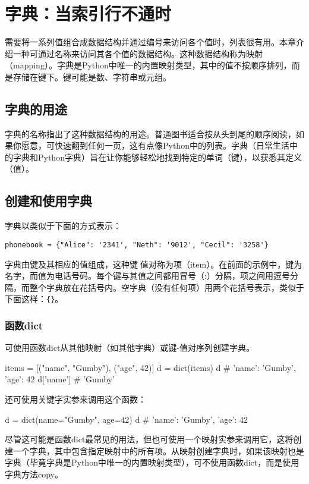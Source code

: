 \chapter{字典：当索引行不通时\label{chapter04}}
需要将一系列值组合成数据结构并通过编号来访问各个值时，列表很有用。本章介绍一种可通过名称来访问其各个值的数据结构。这种数据结构称为映射（mapping）。字典是Python中唯一的内置映射类型，其中的值不按顺序排列，而是存储在键下。键可能是数、字符串或元组。

\section{字典的用途}
字典的名称指出了这种数据结构的用途。普通图书适合按从头到尾的顺序阅读，如果你愿意，可快速翻到任何一页，这有点像Python中的列表。字典（日常生活中的字典和Python字典）旨在让你能够轻松地找到特定的单词（键），以获悉其定义（值）。

\section{创建和使用字典}
字典以类似于下面的方式表示：

\verb|phonebook = {"Alice": '2341', "Neth": '9012', "Cecil": '3258'}|

字典由键及其相应的值组成，这种键值对称为项（item）。在前面的示例中，键为名字，而值为电话号码。每个键与其值之间都用冒号（:）分隔，项之间用逗号分隔，而整个字典放在花括号内。空字典（没有任何项）用两个花括号表示，类似于下面这样：\verb|{}|。


\subsection{函数dict}
可使用函数dict从其他映射（如其他字典）或键-值对序列创建字典。

\begin{pyc}
items = [("name", "Gumby"), ("age", 42)]
d = dict(items)
d  # {'name': 'Gumby', 'age': 42}
d['name']  # 'Gumby'
\end{pyc}
还可使用关键字实参来调用这个函数：
\begin{pyc}
d = dict(name="Gumby", age=42)
d  # {'name': 'Gumby', 'age': 42}
\end{pyc}

尽管这可能是函数dict最常见的用法，但也可使用一个映射实参来调用它，这将创建一个字典，其中包含指定映射中的所有项。从映射创建字典时，如果该映射也是字典（毕竟字典是Python中唯一的内置映射类型），可不使用函数dict，而是使用字典方法copy。

